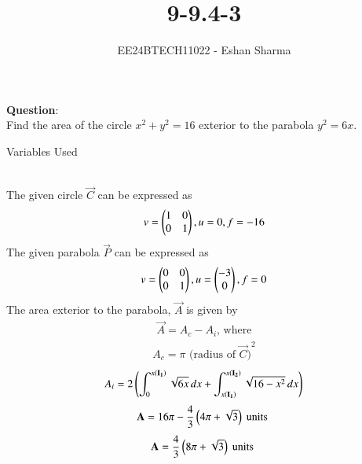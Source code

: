 \documentclass[journal]{IEEEtran}
\begin{document}

\vspace{3cm}

\title{9-9.4-3}
\author{EE24BTECH11022 - Eshan Sharma}
{\let\newpage\relax\maketitle}

\renewcommand{\thefigure}{\theenumi}
\renewcommand{\thetable}{\theenumi}
\setlength{\intextsep}{10pt} %


\renewcommand{\thetable}{\theenumi}

\textbf{Question}:\\
Find the area of the circle $x^{2}+y^{2} = 16$ exterior to the parabola $y^{2} = 6x$.
\\
\begin{table}[h!]    
  \centering
  
  \caption{Variables Used}
  \label{tab0}
\end{table}
\solution\\
The given circle $\vec{C}$ can be expressed as
\begin{align}
	v = \begin{pmatrix}1&0\\0&1\end{pmatrix}, u = 0, f = -16
\end{align}
The given parabola $\vec{P}$ can be expressed as
\begin{align}
	v = \begin{pmatrix}0&0\\0&1\end{pmatrix}, u = \begin{pmatrix}-3\\0\end{pmatrix}, f = 0
\end{align}
The area exterior to the parabola, $\vec{A}$ is given by
\begin{align}
	\vec{A} = A_c - A_i \text{, where}
\end{align}
\begin{align}
	A_c = \pi \text{ (radius of $\vec{C}$)}^{2}
\end{align}	
\begin{align}
	A_i = 2\left(\int_{0}^{x\left(\mathbf{I_1}\right)} \sqrt{6x} \, dx + \int_{x\left(\mathbf{I_1}\right)}^{x\left(\mathbf{I_2}\right)} \sqrt{16-x^{2}} \, dx\right)
\end{align}
\begin{align}
	\mathbf{A} = 16\pi - \frac{4}{3}\left(4\pi + \sqrt{3}\right) \text{ units }
\end{align}
\begin{align}
	\mathbf{A} = \frac{4}{3}\left(8\pi + \sqrt{3}\right) \text{ units }
\end{align}
\end{document}
